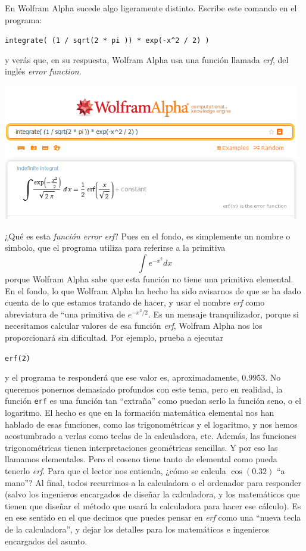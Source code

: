 \documentclass[10pt,a4paper]{article}\usepackage[]{graphicx}\usepackage[]{color}
\begin{document}
En Wolfram Alpha sucede algo ligeramente distinto. Escribe este comando en el programa:
\begin{center}
\verb#integrate( (1 / sqrt(2 * pi )) * exp(-x^2 / 2) )#
\end{center}
y verás que, en su respuesta, Wolfram Alpha usa una función llamada {\em erf}, del inglés {\em error function}.
\begin{center}
\includegraphics[width=13cm]{../fig/Tut05-64.png}
\end{center}
¿Qué es esta {\em función error erf}? Pues en el fondo, es simplemente un nombre o símbolo, que el programa utiliza para referirse a la primitiva
\[
\int e^{- x^2}dx
\]
porque Wolfram Alpha sabe que esta función no tiene una primitiva elemental. En el fondo, lo que Wolfram Alpha ha hecho ha sido avisarnos de que se ha dado cuenta de lo que estamos tratando de hacer, y  usar el nombre {\em erf} como abreviatura de ``una primitiva de $e^{-x^2/2}$. Es un mensaje tranquilizador, porque si necesitamos calcular valores de esa función {\em erf}, Wolfram Alpha nos los proporcionará sin dificultad. Por ejemplo, prueba a ejecutar
\begin{center}
{\tt erf(2)}
\end{center}
y el programa te responderá que ese valor es, aproximadamente, $0.9953$. No queremos ponernos demasiado profundos con este tema, pero en realidad, la función {\tt erf} es una función tan ``extraña'' como puedan serlo la función seno, o el logaritmo. El hecho es que en la formación matemática elemental nos han hablado de esas funciones, como las trigonométricas y el logaritmo, y nos hemos acostumbrado a verlas como teclas de la calculadora, etc. Además, las funciones trigonométricas tienen interpretaciones geométricas sencillas. Y por eso las llamamos elementales. Pero el coseno tiene tanto de elemental como pueda tenerlo {\em erf}. Para que el lector nos entienda, ¿cómo se calcula $\cos(0.32)$ ``a mano''? Al final, todos recurrimos a la calculadora o el ordenador para responder (salvo los ingenieros encargados de diseñar la calculadora, y los matemáticos que tienen que diseñar el método que usará la calculadora para hacer ese cálculo). Es en ese sentido en el que decimos que puedes pensar en {\em erf} como una ``nueva tecla de la calculadora'', y dejar los detalles para los matemáticos e ingenieros encargados del asunto.
\end{document}
